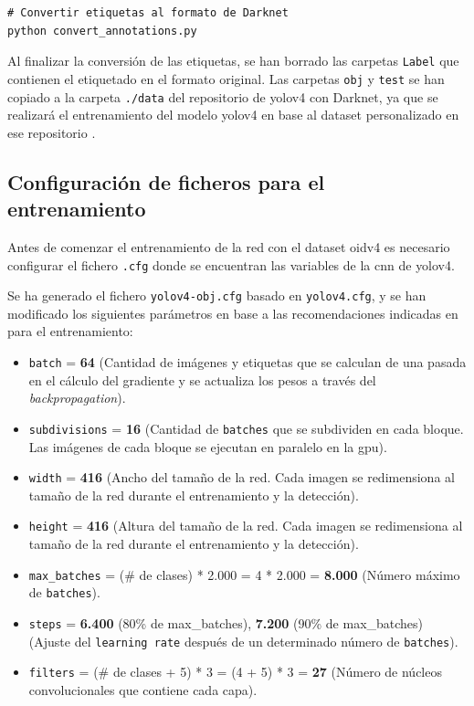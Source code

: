 \vspace{0.5cm}
\begin{lstlisting}[language=iPython,caption=Descarga dataset Open Images Dataset v4 (3),captionpos=b,label={lst:download-oidv4_3}]
# Convertir etiquetas al formato de Darknet
python convert_annotations.py
\end{lstlisting}

Al finalizar la conversión de las etiquetas, se han borrado las carpetas \texttt{Label} que contienen el etiquetado en el formato original. Las carpetas \texttt{obj} y \texttt{test} se han copiado a la carpeta \texttt{./data} del repositorio de \gls{yolov4} con Darknet, ya que se realizará el entrenamiento del modelo \gls{yolov4} en base al dataset personalizado en ese repositorio \cite{yolov4-darknet-github}.

\subsection{Configuración de ficheros para el entrenamiento}
\label{subsec:configuracion-ficheros-training}

Antes de comenzar el entrenamiento de la red con el dataset \gls{oidv4} es necesario configurar el fichero \texttt{.cfg} donde se encuentran las variables de la \gls{cnn} de \gls{yolov4}.

Se ha generado el fichero \texttt{yolov4-obj.cfg} basado en \texttt{yolov4.cfg}, y se han modificado los siguientes parámetros en base a las recomendaciones indicadas en \cite{yolov4-darknet-github} para el entrenamiento:

\begin{itemize}
    \item \texttt{batch} = \textbf{64} (Cantidad de imágenes y etiquetas que se calculan de una pasada en el cálculo del gradiente y se actualiza los pesos a través del \textit{backpropagation}).
    \item \texttt{subdivisions} = \textbf{16} (Cantidad de \texttt{batches} que se subdividen en cada bloque. Las imágenes de cada bloque se ejecutan en paralelo en la \gls{gpu}).
    \item \texttt{width} = \textbf{416} (Ancho del tamaño de la red. Cada imagen se redimensiona al tamaño de la red durante el entrenamiento y la detección).
    \item \texttt{height} = \textbf{416} (Altura del tamaño de la red. Cada imagen se redimensiona al tamaño de la red durante el entrenamiento y la detección).
    \item \texttt{max\_batches} = (\# de clases) * 2.000 = 4 * 2.000 = \textbf{8.000} (Número máximo de \texttt{batches}).
    \item \texttt{steps} = \textbf{6.400} (80\% de max\_batches), \textbf{7.200} (90\% de max\_batches) (Ajuste del \texttt{learning rate} después de un determinado número de \texttt{batches}).
    \item \texttt{filters} = (\# de clases + 5) * 3 = (4 + 5) * 3 = \textbf{27} (Número de núcleos convolucionales que contiene cada capa).
\end{itemize}

